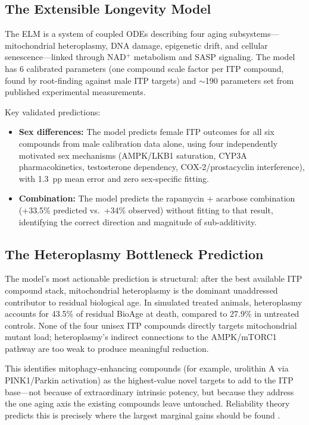 \documentclass[11pt]{article}
\begin{document}
\subsection{The Extensible Longevity Model}

The ELM \citep{Biggs2025elm} is a system of coupled ODEs describing four aging subsystems---mitochondrial heteroplasmy, DNA damage, epigenetic drift, and cellular senescence---linked through NAD$^+$ metabolism and SASP signaling. The model has 6 calibrated parameters (one compound scale factor per ITP compound, found by root-finding against male ITP targets) and $\sim$190 parameters set from published experimental measurements.

Key validated predictions:
\begin{itemize}
\item \textbf{Sex differences:} The model predicts female ITP outcomes for all six compounds from male calibration data alone, using four independently motivated sex mechanisms (AMPK/LKB1 saturation, CYP3A pharmacokinetics, testosterone dependency, COX-2/prostacyclin interference), with 1.3~pp mean error and zero sex-specific fitting.
\item \textbf{Combination:} The model predicts the rapamycin + acarbose combination (+33.5\% predicted vs.\ +34\% observed) without fitting to that result, identifying the correct direction and magnitude of sub-additivity.
\end{itemize}

\subsection{The Heteroplasmy Bottleneck Prediction}

The model's most actionable prediction is structural: after the best available ITP compound stack, mitochondrial heteroplasmy is the dominant unaddressed contributor to residual biological age. In simulated treated animals, heteroplasmy accounts for 43.5\% of residual BioAge at death, compared to 27.9\% in untreated controls. None of the four unisex ITP compounds directly targets mitochondrial mutant load; heteroplasmy's indirect connections to the AMPK/mTORC1 pathway are too weak to produce meaningful reduction.

This identifies mitophagy-enhancing compounds (for example, urolithin A via PINK1/Parkin activation) as the highest-value novel targets to add to the ITP base---not because of extraordinary intrinsic potency, but because they address the one aging axis the existing compounds leave untouched. Reliability theory predicts this is precisely where the largest marginal gains should be found \citep{Gavrilov2001}.
\end{document}
